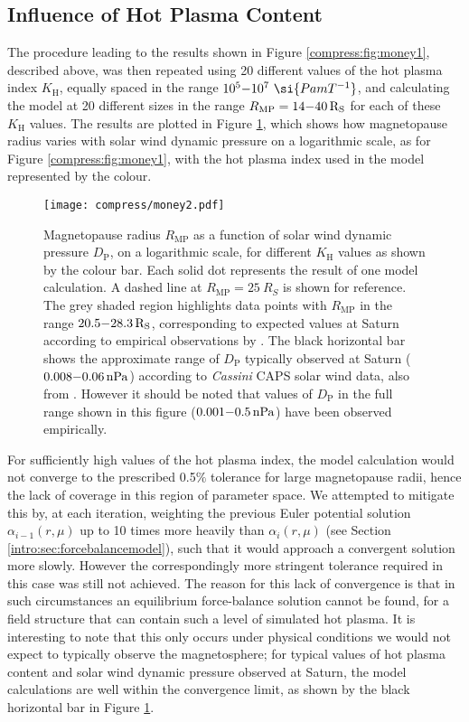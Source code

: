 \subsection{Influence of Hot Plasma Content} \label{compress:sec:hotplasma}
The procedure leading to the results shown in Figure \ref{compress:fig:money1}, described above, was then repeated using 20 different values of the hot plasma index $K_\mathrm{H}$, equally spaced in the range $10^5 {\--} 10^7~\si{Pa m T^{-1}}$, and calculating the model at 20 different sizes in the range $R_\mathrm{MP} = 14{\--}\SI{40}{R_S}$ for each of these $K_\mathrm{H}$ values. The results are plotted in Figure \ref{compress:fig:money2}, which shows how magnetopause radius varies with solar wind dynamic pressure on a logarithmic scale, as for Figure \ref{compress:fig:money1}, with the hot plasma index used in the model represented by the colour.
\begin{figure}
\centering
\noindent\texttt{[image: compress/money2.pdf]}
\caption[Magnetopause radius versus solar wind dynamic pressure compressibility profiles for a range of $K_\mathrm{H}$.]{Magnetopause radius $R_\mathrm{MP}$ as a function of solar wind dynamic pressure $D_\mathrm{P}$, on a logarithmic scale, for different $K_\mathrm{H}$ values as shown by the colour bar. Each solid dot represents the result of one model calculation. A dashed line at $R_\mathrm{MP}{=}\SI{25}{R_S}$ is shown for reference. The grey shaded region highlights data points with $R_\mathrm{MP}$ in the range $20.5{\--}\SI{28.3}{R_S}$, corresponding to expected values at Saturn according to empirical observations by \citet{achilleos2008}. The black horizontal bar shows the approximate range of $D_\mathrm{P}$ typically observed at Saturn ($0.008 {\--} \SI{0.06}{nPa}$) according to \textit{Cassini} CAPS solar wind data, also from \citet{achilleos2008}. However it should be noted that values of $D_\mathrm{P}$ in the full range shown in this figure ($0.001 {\--} \SI{0.5}{nPa}$) have been observed empirically.} 
\label{compress:fig:money2}
\end{figure}
 
For sufficiently high values of the hot plasma index, the model calculation would not converge to the prescribed 0.5$\%$ tolerance for large magnetopause radii, hence the lack of coverage in this region of parameter space. We attempted to mitigate this by, at each iteration, weighting the previous Euler potential solution $\alpha_{i-1}(r,\mu)$ up to 10 times more heavily than $\alpha_{i}(r,\mu)$ (see Section \ref{intro:sec:forcebalancemodel}), such that it would approach a convergent solution more slowly. However the correspondingly more stringent tolerance required in this case was still not achieved. The reason for this lack of convergence is that in such circumstances an equilibrium force-balance solution cannot be found, for a field structure that can contain such a level of simulated hot plasma. It is interesting to note that this only occurs under physical conditions we would not expect to typically observe the magnetosphere; for typical values of hot plasma content and solar wind dynamic pressure observed at Saturn, the model calculations are well within the convergence limit, as shown by the black horizontal bar in Figure \ref{compress:fig:money2}.

